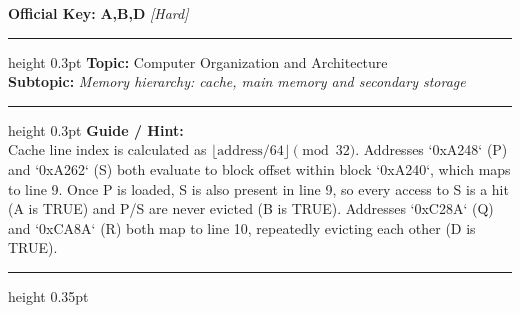 \documentclass[a4paper,10pt]{article}
\begin{document}
\begin{tcolorbox}
\textbf{Official Key:} \textbf{\large A,B,D} \hfill \textit{\small [Hard]}
\vspace{2pt}\hrule height 0.3pt\vspace{3pt}
\textbf{Topic:} Computer Organization and Architecture \\
\textbf{Subtopic:} \textit{Memory hierarchy: cache, main memory and secondary storage}
\vspace{2pt}\hrule height 0.3pt\vspace{3pt}
\textbf{Guide / Hint:} \\
{\small Cache line index is calculated as $\lfloor \text{address} / 64 \rfloor \pmod{32}$. Addresses `0xA248` (P) and `0xA262` (S) both evaluate to block offset within block `0xA240`, which maps to line 9. Once P is loaded, S is also present in line 9, so every access to S is a hit (A is TRUE) and P/S are never evicted (B is TRUE). Addresses `0xC28A` (Q) and `0xCA8A` (R) both map to line 10, repeatedly evicting each other (D is TRUE).}

\end{tcolorbox}
\vspace{6pt}\hrule height 0.35pt\vspace{6pt}
\noindent
\end{document}

